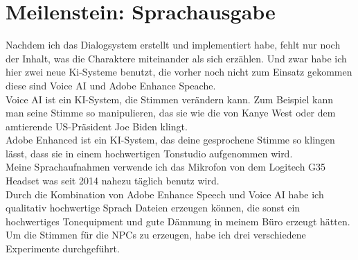 \section {Meilenstein: Sprachausgabe}
Nachdem ich das Dialogsystem erstellt und implementiert habe, fehlt nur noch der Inhalt, was die Charaktere miteinander als sich erzählen. Und zwar habe ich hier zwei neue Ki-Systeme benutzt, die vorher noch nicht zum Einsatz gekommen diese sind Voice AI und Adobe Enhance Speache.
\\
Voice AI ist ein KI-System, die Stimmen verändern kann. Zum Beispiel kann man seine Stimme so manipulieren, das sie wie die von Kanye West oder dem amtierende US-Präsident Joe Biden klingt.
\\
Adobe Enhanced ist ein KI-System, das deine gesprochene Stimme so klingen lässt, dass sie in einem hochwertigen Tonstudio aufgenommen wird.
\\
Meine Sprachaufnahmen verwende ich das Mikrofon von dem Logitech G35 Headset was seit 2014 nahezu täglich benutz wird.
\\
Durch die Kombination von Adobe Enhance Speech und Voice AI habe ich qualitativ hochwertige Sprach Dateien erzeugen können, die sonst ein hochwertiges Tonequipment und gute Dämmung in meinem Büro erzeugt hätten.
\\
Um die Stimmen für die NPCs zu erzeugen, habe ich drei verschiedene Experimente durchgeführt.
\\
